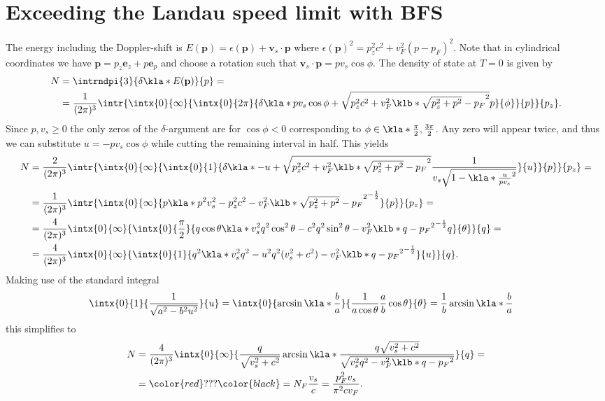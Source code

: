 \documentclass[english, parskip=full]{scrartcl}
\newcommand{\qna}[1]{\color{red}#1\color{black}}
\begin{document}
\section{Exceeding the Landau speed limit with BFS}
The energy including the Doppler-shift is $E(\textbf{p}) = \epsilon(\textbf{p}) + \textbf{v}_s \cdot \textbf{p}$ where $\epsilon(\textbf{p})^2 = p_z^2c^2 + v_F^2 (p-p_F)^2$.
Note that in cylindrical coordinates we have $\textbf{p} = p_z \textbf{e}_z + p \textbf{e}_p$ and choose a rotation such that $\textbf{v}_s \cdot \textbf{p} = pv_s\cos\phi$.
The density of state at $T=0$ is given by
\begin{align}
N &= \intrndpi{3}{\delta\kla*{E(\textbf{p})} }{p} = \\
&= \frac{1}{(2\pi)^3} \intr{ \intx{0}{\infty}{ \intx{0}{2\pi}{ \delta\kla*{pv_s\cos\phi + \sqrt{p_z^2c^2 + v_F^2 \klb*{\sqrt{p_z^2 + p^2} - p_F}^2} } p}{\phi}}{p} }{p_z}.
\end{align}
Since $p,v_s\ge 0$ the only zeros of the $\delta$-argument are for $\cos\phi < 0$ corresponding to $\phi \in \kla*{\frac{\pi}{2}, \frac{3\pi}{2}}$.
Any zero will appear twice, and thus we can substitute $u = -pv_s\cos\phi$ while cutting the remaining interval in half.
This yields
\begin{align}
N &= \frac{2}{(2\pi)^3} \intr{ \intx{0}{\infty}{ \intx{0}{1}{\delta \kla*{- u + \sqrt{p_z^2c^2 + v_F^2 \klb*{\sqrt{p_z^2 + p^2} - p_F}^2 }} \frac{1}{v_s\sqrt{1 - \kla*{\frac{u}{pv_s}}^2}}}{u} }{p}}{p_z} = \\
&= \frac{1}{(2\pi)^3} \intr{ \intx{0}{\infty }{ p \kla*{p^2v_s^2 - p_z^2c^2 - v_F^2 \klb*{\sqrt{p_z^2+p^2} - p_F}^2}^{-\frac{1}{2}} }{p}}{p_z} = \\
&= \frac{4}{(2\pi)^3} \intx{0}{\infty}{\intx{0}{\frac{\pi}{2}}{ q \cos\theta \kla*{v_s^2q^2\cos^2\theta -c^2q^2\sin^2\theta - v_F^2 \klb*{q - p_F}^2 }^{-\frac{1}{2}} q }{\theta}}{q} = \\
&= \frac{4}{(2\pi)^3} \intx{0}{\infty}{ \intx{0}{1}{ q^2 \kla*{v_s^2q^2 - u^2 q^2 (v_s^2 + c^2) - v_F^2 \klb*{q-p_F}^2}^{-\frac{1}{2}}  }{u} }{q}.
\end{align}
Making use of the standard integral 
\begin{align}
\intx{0}{1}{  \frac{1}{\sqrt{a^2 - b^2u^2}}}{u} &= \intx{0}{\arcsin \kla*{\frac{b}{a}} }{ \frac{1}{a \cos\theta} \frac{a}{b}\cos\theta }{\theta} = \frac{1}{b} \arcsin \kla*{\frac{b}{a}}
\end{align}
this simplifies to
\begin{align}
N &= \frac{4}{(2\pi)^3} \intx{0}{\infty}{ \frac{q}{\sqrt{v_s^2+c^2}} \arcsin\kla*{\frac{q\sqrt{v_s^2 + c^2}}{\sqrt{ v_s^2q^2 - v_F^2 \klb*{q-p_F}^2 }}} }{q} = \\
&= \qna{???} = N_F \frac{v_s}{c} = \frac{p_F^2v_s}{\pi^2 c v_F}.
\end{align}
\end{document}
